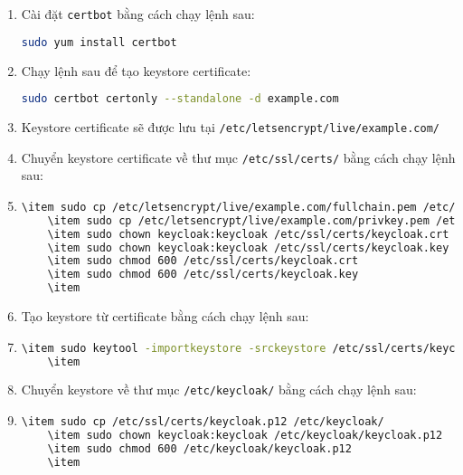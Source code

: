\begin{enumerate}
    \item Cài đặt \texttt{certbot} bằng cách chạy lệnh sau:
    \begin{lstlisting}[language=bash]
    sudo yum install certbot
    \end{lstlisting}
    \item Chạy lệnh sau để tạo keystore certificate:
    \begin{lstlisting}[language=bash]
    sudo certbot certonly --standalone -d example.com
    \end{lstlisting}
    \item Keystore certificate sẽ được lưu tại \texttt{/etc/letsencrypt/live/example.com/}
    \item Chuyển keystore certificate về thư mục \texttt{/etc/ssl/certs/} bằng cách chạy lệnh sau:
    \item \begin{lstlisting}[language=bash]
    \item sudo cp /etc/letsencrypt/live/example.com/fullchain.pem /etc/ssl/certs/keycloak.crt
    \item sudo cp /etc/letsencrypt/live/example.com/privkey.pem /etc/ssl/certs/keycloak.key
    \item sudo chown keycloak:keycloak /etc/ssl/certs/keycloak.crt
    \item sudo chown keycloak:keycloak /etc/ssl/certs/keycloak.key
    \item sudo chmod 600 /etc/ssl/certs/keycloak.crt
    \item sudo chmod 600 /etc/ssl/certs/keycloak.key
    \item \end{lstlisting}
    \item Tạo keystore từ certificate bằng cách chạy lệnh sau:
    \item \begin{lstlisting}[language=bash]
    \item sudo keytool -importkeystore -srckeystore /etc/ssl/certs/keycloak.jks -destkeystore /etc/ssl/certs/keycloak.p12 -deststoretype PKCS12
    \item \end{lstlisting}
    \item Chuyển keystore về thư mục \texttt{/etc/keycloak/} bằng cách chạy lệnh sau:
    \item \begin{lstlisting}[language=bash]
    \item sudo cp /etc/ssl/certs/keycloak.p12 /etc/keycloak/
    \item sudo chown keycloak:keycloak /etc/keycloak/keycloak.p12
    \item sudo chmod 600 /etc/keycloak/keycloak.p12
    \item \end{lstlisting}
\end{enumerate}

